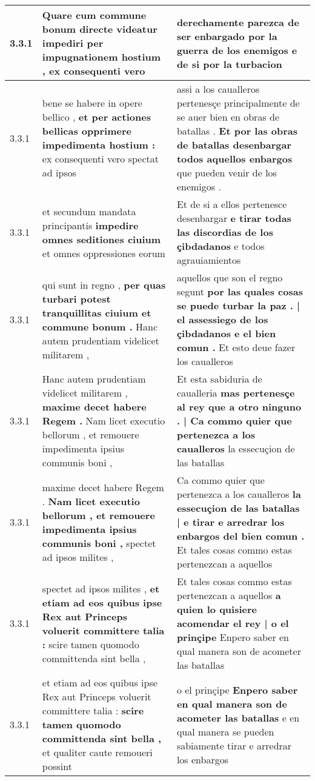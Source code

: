 \begin{tabular}{|p{1cm}|p{6.5cm}|p{6.5cm}|}
3.3.1 & Quare cum commune bonum directe videatur \textbf{ impediri per impugnationem hostium , } ex consequenti vero & derechamente parezca de ser enbargado \textbf{ por la guerra de los enemigos } e de si por la turbacion \\\hline
3.3.1 & bene se habere in opere bellico , \textbf{ et per actiones bellicas opprimere impedimenta hostium : } ex consequenti vero spectat ad ipsos & assi a los caualleros pertenesçe principalmente de se auer bien en obras de batallas . \textbf{ Et por las obras de batallas desenbargar todos aquellos enbargos } que pueden venir de los enemigos . \\\hline
3.3.1 & et secundum mandata principantis \textbf{ impedire omnes seditiones ciuium } et omnes oppressiones eorum & Et de si a ellos pertenesce desenbargar \textbf{ e tirar todas las discordias de los çibdadanos } e todos agrauiamientos \\\hline
3.3.1 & qui sunt in regno , \textbf{ per quas turbari potest tranquillitas ciuium et commune bonum . } Hanc autem prudentiam videlicet militarem , & aquellos que son el regno segunt \textbf{ por las quales cosas se puede turbar la paz . | el assessiego de los çibdadanos e el bien comun . } Et esto deue fazer los caualleros \\\hline
3.3.1 & Hanc autem prudentiam videlicet militarem , \textbf{ maxime decet habere Regem . } Nam licet executio bellorum , et remouere impedimenta ipsius communis boni , & Et esta sabiduria de caualleria \textbf{ mas pertenesçe al rey que a otro ninguno . | Ca commo quier que pertenezca a los caualleros } la essecuçion de las batallas \\\hline
3.3.1 & maxime decet habere Regem . \textbf{ Nam licet executio bellorum , et remouere impedimenta ipsius communis boni , } spectet ad ipsos milites , & Ca commo quier que pertenezca a los caualleros \textbf{ la essecuçion de las batallas | e tirar e arredrar los enbargos del bien comun . } Et tales cosas commo estas pertenezcan a aquellos \\\hline
3.3.1 & spectet ad ipsos milites , \textbf{ et etiam ad eos quibus ipse Rex aut Princeps voluerit committere talia : } scire tamen quomodo committenda sint bella , & Et tales cosas commo estas pertenezcan a aquellos \textbf{ a quien lo quisiere acomendar el rey | o el prinçipe } Enpero saber en qual manera son de acometer las batallas \\\hline
3.3.1 & et etiam ad eos quibus ipse Rex aut Princeps voluerit committere talia : \textbf{ scire tamen quomodo committenda sint bella , } et qualiter caute remoueri possint & o el prinçipe \textbf{ Enpero saber en qual manera son de acometer las batallas } e en qual manera se pueden sabiamente tirar e arredrar los enbargos \\\hline

\end{tabular}

